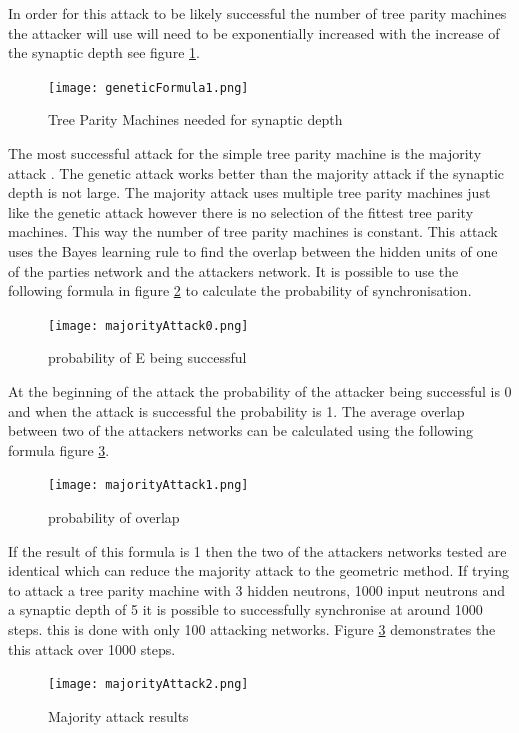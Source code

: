 In order for this attack to be likely successful the number of tree parity machines the attacker will use will need to be exponentially increased with the increase of the synaptic depth see figure \ref{fig:geneticEMachine}.
\begin{figure}[ht]
  \centering
      \texttt{[image: geneticFormula1.png]}
  \caption[Tree Parity Machines needed for synaptic depth]{Tree Parity Machines needed for synaptic depth\cite{BIG_ResearchPaper}}
  \label{fig:geneticEMachine}
\end{figure}

The most successful attack for the simple tree parity machine is the majority attack \cite{BIG_ResearchPaper}. The genetic attack works better than the majority attack if the synaptic depth is not large. The majority attack uses multiple tree parity machines just like the genetic attack however there is no selection of the fittest tree parity machines. This way the number of tree parity machines is constant. This attack uses the Bayes learning rule \cite{Bayes_rule} to find the overlap between the hidden units of one of the parties network and the attackers network.
It is possible to use the following formula in figure \ref{fig:majority0} to calculate the probability of synchronisation. 
\begin{figure}[ht]
  \centering
      \texttt{[image: majorityAttack0.png]}
  \caption[probability of E being successful]{probability of E being successful\cite{BIG_ResearchPaper}}
  \label{fig:majority0}
\end{figure}
At the beginning of the attack the probability of the attacker being successful is 0 and when the attack is successful the probability is 1.
The average overlap between two of the attackers networks can be calculated using the following formula figure \ref{fig:majority1}.
\begin{figure}[ht]
  \centering
      \texttt{[image: majorityAttack1.png]}
  \caption[probability of overlap]{probability of overlap\cite{BIG_ResearchPaper}}
  \label{fig:majority1}
\end{figure}
If the result of this formula is 1 then the two of the attackers networks tested are identical which can reduce the majority attack to the geometric method.
If trying to attack a tree parity machine with 3 hidden neutrons, 1000 input neutrons and a synaptic depth of 5 it is possible to successfully synchronise at around 1000 steps. this is done with only 100 attacking networks. Figure \ref{fig:majority1} demonstrates the this attack over 1000 steps.
\begin{figure}[ht]
  \centering
      \texttt{[image: majorityAttack2.png]}
  \caption[Majority attack results]{Majority attack results\cite{BIG_ResearchPaper}}
  \label{fig:majority2}
\end{figure}